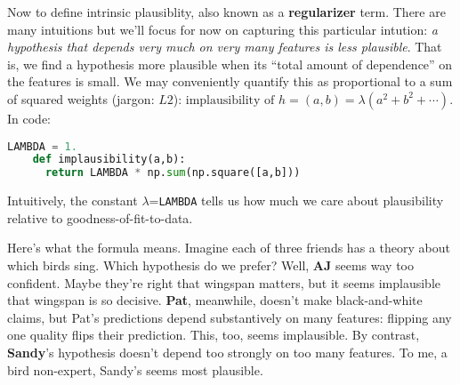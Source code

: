 \newpage
{}
  Now to define intrinsic plausiblity, also known as a \textbf{regularizer} term.
  There are many intuitions
  but we'll focus for now on capturing this particular intution:
  \emph{a hypothesis that depends very much on very many features is less
  plausible}.
  That is, we find a hypothesis more plausible when its ``total amount of
  dependence'' on the features is small.  We may conveniently quantify this as
  proportional to a sum of squared weights (jargon: \textbf{$L2$}):
  $
    \text{implausibility of $h=(a,b)$}
    =
    \lambda (a^2 + b^2 + \cdots)
  $.  In code:
  \begin{lstlisting}[language=Python, basicstyle=\footnotesize\ttfamily]
    LAMBDA = 1.
    def implausibility(a,b):
      return LAMBDA * np.sum(np.square([a,b]))
  \end{lstlisting}
  Intuitively, the constant $\lambda$=\texttt{LAMBDA} tells us how much we care
  about plausibility relative to goodness-of-fit-to-data.

  Here's what the formula means.
  Imagine each of three friends has a theory
  about which birds sing.
  Which hypothesis do we prefer?  Well, \textbf{AJ} seems way too confident.
  Maybe they're right that wingspan matters, but it seems implausible that
  wingspan is so decisive.  \textbf{Pat}, meanwhile, doesn't make
  black-and-white claims, but Pat's predictions depend substantively on many
  features: flipping any one quality flips their prediction.  This, too, seems
  implausible.  By contrast, \textbf{Sandy}'s hypothesis doesn't depend too
  strongly on too many features.  To me, a bird non-expert, Sandy's seems most
  plausible.

